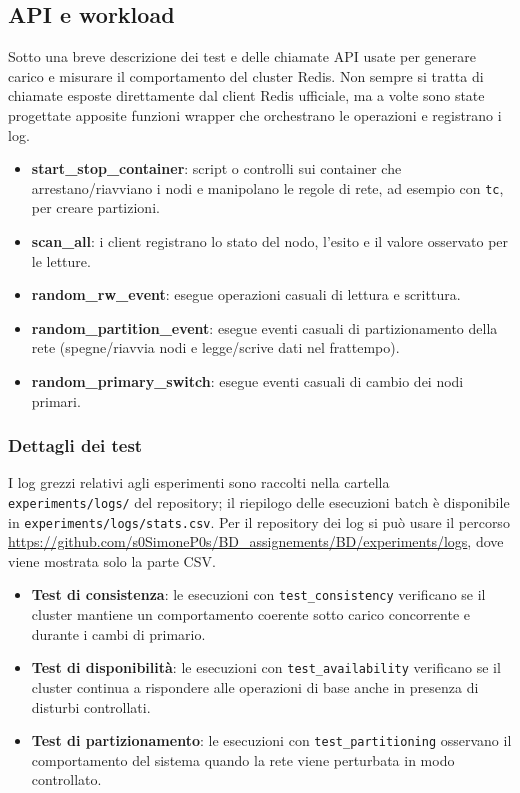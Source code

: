 \documentclass{article}
\begin{document}
\subsection{API e workload}

Sotto una breve descrizione dei test e delle chiamate API usate per generare carico e misurare %
il comportamento del cluster Redis. %
Non sempre si tratta di chiamate esposte direttamente dal client Redis ufficiale, %
ma a volte sono state progettate apposite funzioni wrapper che orchestrano le operazioni e registrano i log.


\begin{itemize}
    \item \textbf{start\_stop\_container}: script o controlli sui container che arrestano/riavviano i nodi %
e manipolano le regole di rete, ad esempio con \texttt{tc}, per creare partizioni.
    \item \textbf{scan\_all}: i client registrano lo stato del nodo, %
    l'esito e il valore osservato per le letture.
    \item \textbf{random\_rw\_event}: esegue operazioni casuali di lettura e scrittura.
    \item \textbf{random\_partition\_event}: esegue eventi casuali di partizionamento della rete (spegne/riavvia %
nodi e legge/scrive dati nel frattempo).
    \item \textbf{random\_primary\_switch}: esegue eventi casuali di cambio dei nodi primari.
\end{itemize}

\subsubsection{Dettagli dei test}
I log grezzi relativi agli esperimenti sono raccolti nella cartella \texttt{experiments/logs/} del repository; %
il riepilogo delle esecuzioni batch è disponibile in \texttt{experiments/logs/stats.csv}. %
Per il repository dei log si può usare il percorso %
\url{https://github.com/s0SimoneP0s/BD_assignements/BD/experiments/logs}, dove viene mostrata solo la parte CSV.

\begin{itemize}
    \item \textbf{Test di consistenza}: le esecuzioni con \texttt{test\_consistency} verificano se il cluster mantiene un comportamento coerente sotto carico concorrente e durante i cambi di primario.
    \item \textbf{Test di disponibilità}: le esecuzioni con \texttt{test\_availability} verificano se il cluster continua a rispondere alle operazioni di base anche in presenza di disturbi controllati.
    \item \textbf{Test di partizionamento}: le esecuzioni con \texttt{test\_partitioning} osservano il comportamento del sistema quando la rete viene perturbata in modo controllato.
\end{itemize}
\end{document}
